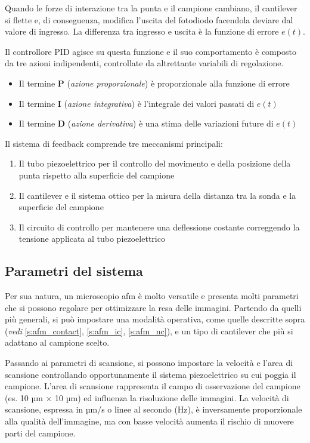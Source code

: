 \documentclass[../main.tex]{subfiles}
\begin{document}
Quando le forze di interazione tra la punta e il campione cambiano, il cantilever si flette e, di conseguenza, modifica l'uscita del fotodiodo facendola deviare dal valore di ingresso. La differenza tra ingresso e uscita è la funzione di errore $e(t)$.

Il controllore PID agisce su questa funzione e il suo comportamento è composto da tre azioni indipendenti, controllate da altrettante variabili di regolazione.\cite{ogata_2010}
\begin{itemize}
	\item Il termine \textbf{P} (\textit{azione proporzionale}) è proporzionale alla funzione di errore
	\item Il termine \textbf{I} (\textit{azione integrativa}) è l'integrale dei valori passati di $e(t)$
	\item Il termine \textbf{D} (\textit{azione derivativa}) è una stima delle variazioni future di $e(t)$
\end{itemize}

Il sistema di feedback comprende tre meccanismi principali: \cite{parisi}
\begin{enumerate}
	\item Il tubo piezoelettrico per il controllo del movimento e della posizione della punta rispetto alla superficie del campione
	\item Il cantilever e il sistema ottico per la misura della distanza tra la sonda e la superficie del campione
	\item Il circuito di controllo per mantenere una deflessione costante correggendo la tensione applicata al tubo piezoelettrico
\end{enumerate}

\subsection{Parametri del sistema}

Per sua natura, un microscopio \acrshort{afm} è molto versatile e presenta molti parametri che si possono regolare per ottimizzare la resa delle immagini. Partendo da quelli più generali, si può impostare una modalità operativa, come quelle descritte sopra (\textit{vedi} \ref{s:afm_contact}, \ref{s:afm_ic}, \ref{s:afm_nc}), e un tipo di cantilever che più si adattano al campione scelto.

Passando ai parametri di scansione, si possono impostare la velocità e l'area di scansione controllando opportunamente il sistema piezoelettrico su cui poggia il campione. L'area di scansione rappresenta il campo di osservazione del campione (es. 10 µm × 10 µm) ed influenza la risoluzione delle immagini. La velocità di scansione, espressa in µm/s o linee al secondo (Hz), è inversamente proporzionale alla qualità dell'immagine, ma con basse velocità aumenta il rischio di muovere parti del campione.
\end{document}
